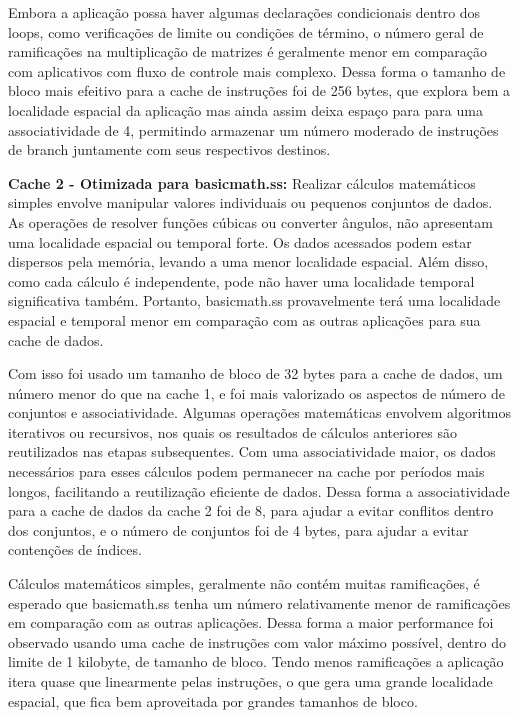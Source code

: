 \documentclass[12pt]{article}
\begin{document}
Embora a aplicação possa haver algumas declarações condicionais dentro dos loops, como verificações de limite ou condições de término, o número geral de ramificações na multiplicação de matrizes é geralmente menor em comparação com aplicativos com fluxo de controle mais complexo. Dessa forma o tamanho de bloco mais efeitivo para a cache de instruções foi de 256 bytes, que explora bem a localidade espacial da aplicação mas ainda assim deixa espaço para para uma associatividade de 4, permitindo armazenar um número moderado de instruções de branch juntamente com seus respectivos destinos.

\textbf{Cache 2 - Otimizada para basicmath.ss:}
Realizar cálculos matemáticos simples envolve manipular valores individuais ou pequenos conjuntos de dados. As operações de resolver funções cúbicas ou converter ângulos, não apresentam uma localidade espacial ou temporal forte. Os dados acessados podem estar dispersos pela memória, levando a uma menor localidade espacial. Além disso, como cada cálculo é independente, pode não haver uma localidade temporal significativa também. Portanto, basicmath.ss provavelmente terá uma localidade espacial e temporal menor em comparação com as outras aplicações para sua cache de dados.

Com isso foi usado um tamanho de bloco de 32 bytes para a cache de dados, um número menor do que na cache 1, e foi mais valorizado os aspectos de número de conjuntos e associatividade. Algumas operações matemáticas envolvem algoritmos iterativos ou recursivos, nos quais os resultados de cálculos anteriores são reutilizados nas etapas subsequentes. Com uma associatividade maior, os dados necessários para esses cálculos podem permanecer na cache por períodos mais longos, facilitando a reutilização eficiente de dados. Dessa forma a associatividade para a cache de dados da cache 2 foi de 8, para ajudar a evitar conflitos dentro dos conjuntos, e o número de conjuntos foi de 4 bytes, para ajudar a evitar contenções de índices.

Cálculos matemáticos simples, geralmente não contém muitas ramificações, é esperado que basicmath.ss tenha um número relativamente menor de ramificações em comparação com as outras aplicações. Dessa forma a maior performance foi observado usando uma cache de instruções com valor máximo possível, dentro do limite de 1 kilobyte, de tamanho de bloco. Tendo menos ramificações a aplicação itera quase que linearmente pelas instruções, o que gera uma grande localidade espacial, que fica bem aproveitada por grandes tamanhos de bloco.
\end{document}

